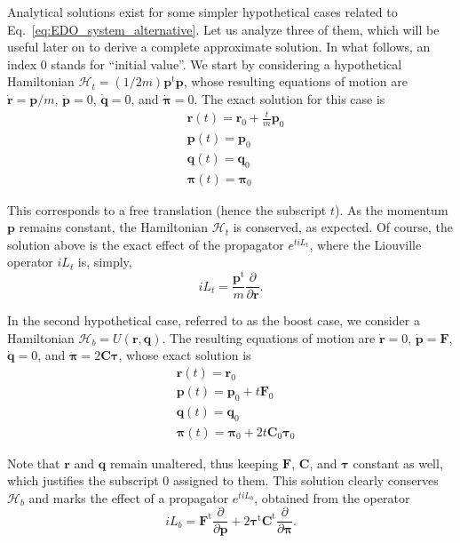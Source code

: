 \documentclass[aip,jcp,reprint,amsmath,amssymb]{revtex4-1}
\newcommand{\mt}[1]{\boldsymbol{\mathbf{#1}}}           %
\newcommand{\vt}[1]{\boldsymbol{\mathbf{#1}}}           %
\newcommand{\tr}[1]{#1^\text{t}}                               %
\newcommand{\diff}[2]{\dfrac{\partial #1}{\partial #2}} %
\begin{document}
Analytical solutions exist for some simpler hypothetical cases related to Eq.~\ref{eq:EDO_system_alternative}. Let us analyze three of them, which will be useful later on to derive a complete approximate solution. In what follows, an index $0$ stands for ``initial value''. We start by considering a hypothetical Hamiltonian $\mathcal{H}_t = (1/2m) \tr{\vt p} \vt p$, whose resulting equations of motion are $\dot{\vt r} = {\vt p}/m$, $\dot{\vt p} = 0$, $\dot{\vt q} = 0$, and $\dot{\vt \pi} = 0$. The exact solution for this case is
\begin{align*}
&{\vt r}(t) = {\vt r}_0 + \frac{t}{m} {\vt p}_0 \\
&{\vt p}(t) = {\vt p}_0 \\
&{\vt q}(t) = {\vt q}_0 \\
&{\vt \pi}(t) = {\vt \pi}_0
\end{align*}

This corresponds to a free translation (hence the subscript $t$). As the momentum $\vt p$ remains constant, the Hamiltonian $\mathcal{H}_t$ is conserved, as expected. Of course, the solution above is the exact effect of the propagator $e^{t i\!L_t}$, where the Liouville operator $i\!L_t$ is, simply,
\[
i L_t = \frac{\tr{\vt p}}{m}\diff{}{\vt r}.
\]

In the second hypothetical case, referred to as the boost case, we consider a Hamiltonian $\mathcal{H}_b = U(\vt r, \vt q)$. The resulting equations of motion are $\dot{\vt r} = 0$, $\dot{\vt p} = \vt F$, $\dot{\vt q} = 0$, and $\dot{\vt \pi} = 2 \mt C \vt \tau$, whose exact solution is
\begin{align*}
&{\vt r}(t) = {\vt r}_0 \\
&{\vt p}(t) = {\vt p}_0 + t \vt F_0 \\
&{\vt q}(t) = {\vt q}_0 \\
&{\vt \pi}(t) = {\vt \pi}_0 +  2 t \mt C_0 \vt \tau_0
\end{align*}

Note that $\vt r$ and $\vt q$ remain unaltered, thus keeping $\vt F$, $\mt C$, and $\vt \tau$ constant as well, which justifies the subscript $0$ assigned to them. This solution clearly conserves $\mathcal{H}_b$ and marks the effect of a propagator $e^{t i\!L_b}$, obtained from the operator
\[
i\!L_b = \tr{\vt F} \diff{}{\vt p} + 2 \tr{\vt \tau} \tr{\mt C} \diff{}{\vt \pi}.
\]
\end{document}
